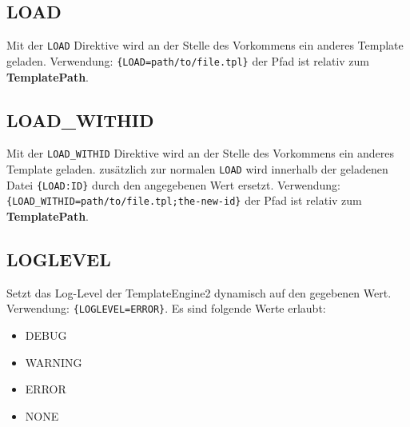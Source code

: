 \documentclass[a4paper,10pt]{article}
\begin{document}
\subsection{LOAD}
Mit der {\tt LOAD} Direktive wird an der Stelle des Vorkommens ein anderes Template geladen.
Verwendung: {\tt \{LOAD=path/to/file.tpl\}} der Pfad ist relativ zum {\bf TemplatePath}.

\subsection{LOAD\_WITHID}
Mit der {\tt LOAD\_WITHID} Direktive wird an der Stelle des Vorkommens ein anderes Template geladen.
zus\"atzlich zur normalen {\tt LOAD} wird innerhalb der geladenen Datei {\tt \{LOAD:ID\}} durch den angegebenen Wert ersetzt.
Verwendung: {\tt \{LOAD\_WITHID=path/to/file.tpl;the-new-id\}} der Pfad ist relativ zum {\bf TemplatePath}.

\subsection{LOGLEVEL}
Setzt das Log-Level der TemplateEngine2 dynamisch auf den gegebenen Wert. Verwendung: {\tt \{LOGLEVEL=ERROR\}}.
Es sind folgende Werte erlaubt:
\begin{itemize}
 \item DEBUG
 \item WARNING
 \item ERROR
 \item NONE
\end{itemize}
\end{document}
